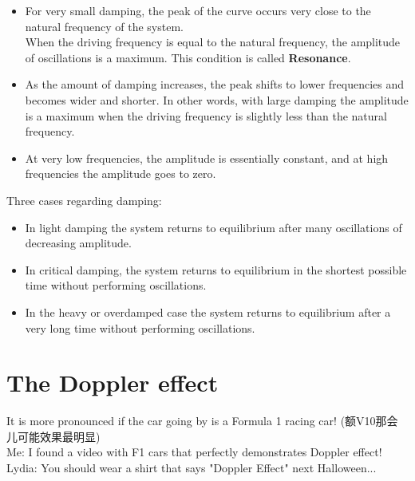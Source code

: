 \documentclass[a4paper,12pt]{article}
\begin{document}
\begin{itemize}
  \item For very small damping, the peak of the curve occurs very close to the natural frequency of the system.\\
  When the driving frequency is equal to the natural frequency, the amplitude of oscillations is a maximum. This condition is called \textbf{Resonance}.
  \item As the amount of damping increases, the peak shifts to lower frequencies and becomes wider and shorter.
In other words, with large damping the amplitude is a maximum when the driving frequency is slightly less
than the natural frequency.
  \item At very low frequencies, the amplitude is essentially constant, and at high frequencies the amplitude goes
to zero.
\end{itemize}
Three cases regarding damping:
\begin{itemize}
  \item In light damping the system returns to
equilibrium after many oscillations of decreasing amplitude.
  \item In critical damping, the system returns to
equilibrium in the shortest possible time without performing oscillations.
  \item In the heavy or overdamped
case the system returns to equilibrium after a very long time without performing oscillations.
\end{itemize}
\newpage
\section{The Doppler effect}
It is more pronounced if the car going by is a Formula 1 racing car! (额V10那会儿可能效果最明显)\\
Me: I found a video with F1 cars that perfectly demonstrates Doppler effect! \\Lydia: You should wear a shirt that says "Doppler Effect" next Halloween...
\end{document}
